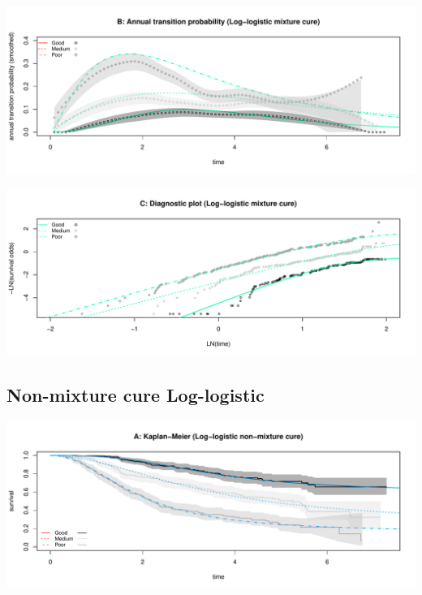 \documentclass[]{article}
\begin{document}
\begin{flushleft}\includegraphics[height=0.25\textheight]{Images/cure_llog_mix-2} \end{flushleft}

\begin{flushleft}\includegraphics[height=0.25\textheight]{Images/cure_llog_mix-3} \end{flushleft}

\newpage

\subsection{Non-mixture cure
Log-logistic}\label{non-mixture-cure-log-logistic}

\begin{flushleft}\includegraphics[height=0.25\textheight]{Images/cure_llog_nmix-1} \end{flushleft}
\end{document}
